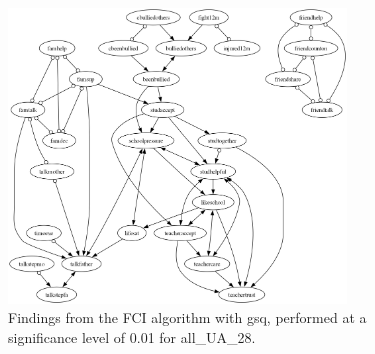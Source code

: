 \begin{figure}[htbp]
    \centering
    \includegraphics[width=0.8\textwidth]{Report/final_report/pictures/FCI_gsq_0.01_all_UA_28.png}
    \caption{Findings from the FCI algorithm with gsq, performed at a significance level of 0.01 for all_UA_28.}
    \label{fig:fci_gsq_0.01all_UA_28}
\end{figure}
